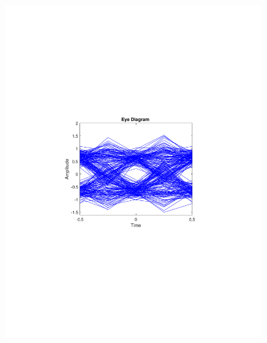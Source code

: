 \begin{refsection}
\begin{figure}[H]
\begin{minipage}{0.30\textwidth}
		\includegraphics[clip, trim=4cm 8cm 4cm 8cm, width=1\textwidth]{./sdf/m_qam_system/figures/expResults/intradyne/5_eye_4GBdInSig13dB_AfPE.pdf}
		\label{fig:4GBdSpecPE1}
	\end{minipage}
	\begin{minipage}{0.30\textwidth}
		\centering

\end{minipage}
\end{figure}
\end{refsection}
